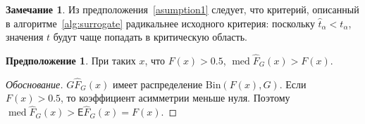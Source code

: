 \documentclass[specialist,
substylefile = spbu_report.rtx,
subf,href,colorlinks=true, 12pt]{disser}
\theoremstyle{definition}
\newtheorem{remark}{Замечание}
\newtheorem{asumption}{Предположение}
\begin{document}
\begin{remark}\label{remark:liberal}
	Из предположения~\ref{asumption1} следует, что критерий, описанный в алгоритме~\ref{alg:surrogate} радикальнее исходного критерия: поскольку $\hat t_\alpha < t_\alpha$, значения $t$ будут чаще попадать в критическую область. 
\end{remark}




\begin{asumption}
	При таких $x$, что $F(x)>0.5$, $\operatorname{med} \hat F_G(x) > F(x)$.
\end{asumption}

\begin{proof}[Обоснование]
	$G \hat F_G(x)$ имеет распределение $\mathrm{Bin}(F(x), G)$. Если $F(x)>0.5$, то коэффициент асимметрии меньше нуля. Поэтому $\operatorname{med} \hat F_G(x) > \mathsf E \hat F_G(x) = F(x)$.
\end{proof}
\end{document}
